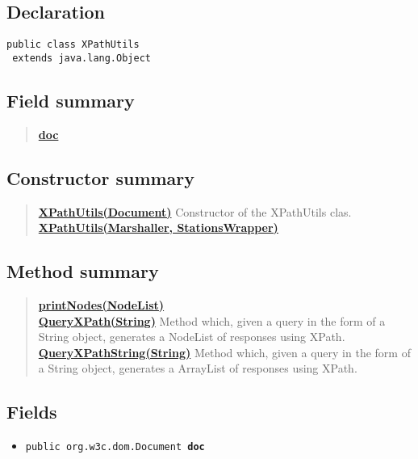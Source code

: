 \documentclass[11pt,a4paper]{report}
\begin{document}
{{{\subsection{Declaration}{
\begin{lstlisting}[frame=none]
public class XPathUtils
 extends java.lang.Object\end{lstlisting}
\subsection{Field summary}{
\begin{verse}
\hyperlink{parsers.XPathUtils.doc}{{\bf doc}} \\
\end{verse}
}
\subsection{Constructor summary}{
\begin{verse}
\hyperlink{parsers.XPathUtils(org.w3c.dom.Document)}{{\bf XPathUtils(Document)}} Constructor of the XPathUtils clas.\\
\hyperlink{parsers.XPathUtils(javax.xml.bind.Marshaller, Models.StationsWrapper)}{{\bf XPathUtils(Marshaller, StationsWrapper)}} \\
\end{verse}
}
\subsection{Method summary}{
\begin{verse}
\hyperlink{parsers.XPathUtils.printNodes(org.w3c.dom.NodeList)}{{\bf printNodes(NodeList)}} \\
\hyperlink{parsers.XPathUtils.QueryXPath(java.lang.String)}{{\bf QueryXPath(String)}} Method which, given a query in the form of a String object, generates a NodeList of responses using XPath.\\
\hyperlink{parsers.XPathUtils.QueryXPathString(java.lang.String)}{{\bf QueryXPathString(String)}} Method which, given a query in the form of a String object, generates a ArrayList of responses using XPath.\\
\end{verse}
}
\subsection{Fields}{
\begin{itemize}
\item{
\label{parsers.XPathUtils.doc}\hypertarget{parsers.XPathUtils.doc}{\texttt{public org.w3c.dom.Document\ {\bf  doc}}
}
}
\end{itemize}
}
}}}}
\end{document}
